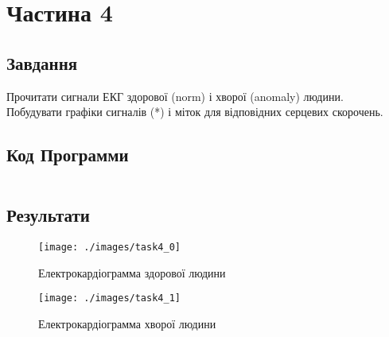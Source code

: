 \section{Частина 4}
\label{sec:task4}

\subsection{Завдання}
\label{subsec:task4_task}

Прочитати сигнали ЕКГ здорової (norm) і хворої (anomaly) людини. \\
Побудувати графіки сигналів (*) і міток для відповідних серцевих скорочень.

\subsection{Код Программи}
\label{subsec:task4_code}
\inputminted{python}{../src/task4.py}

\subsection{Результати}
\label{subsec:task4_results}

\begin{figure}[!ht]
    \centering
    \texttt{[image: ./images/task4\_0]}
    \caption{Електрокардіограмма здорової людини}
    \label{fig:ecg_healthy}
\end{figure}

\begin{figure}[!ht]
    \centering
    \texttt{[image: ./images/task4\_1]}
    \caption{Електрокардіограмма хворої людини}
    \label{fig:ecg_anomaly}
\end{figure}
